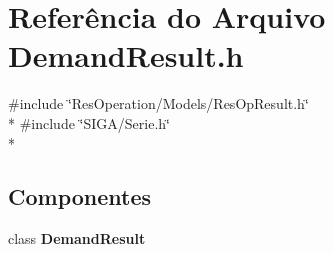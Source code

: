 \section{Referência do Arquivo Demand\+Result.\+h}
\label{_models_2_demand_2_demand_result_8h}
{\ttfamily \#include \char`\"{}Res\+Operation/\+Models/\+Res\+Op\+Result.\+h\char`\"{}}\\*
{\ttfamily \#include \char`\"{}S\+I\+G\+A/\+Serie.\+h\char`\"{}}\\*
\subsection*{Componentes}
\begin{DoxyCompactItemize}
\item 
class {\bf Demand\+Result}
\end{DoxyCompactItemize}
